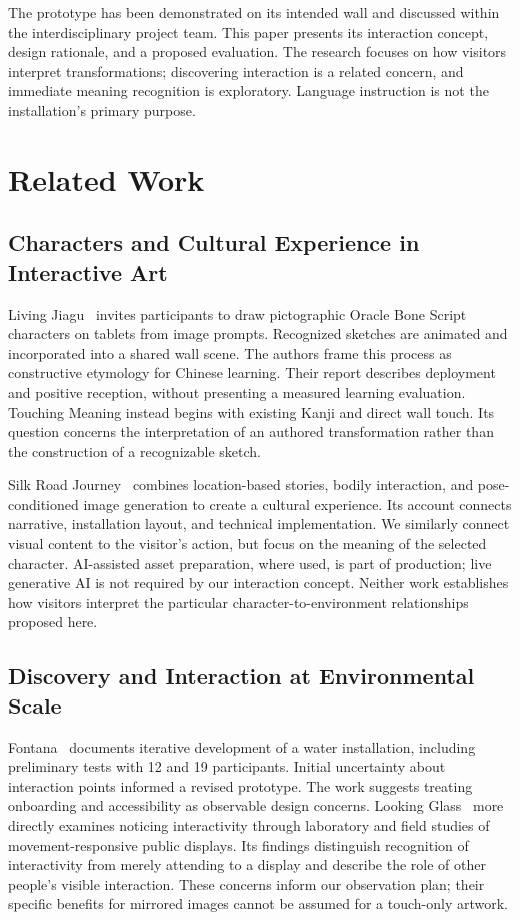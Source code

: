 \documentclass[manuscript,review,anonymous]{acmart}
\begin{document}
The prototype has been demonstrated on its intended wall and discussed within the interdisciplinary project team. This paper presents its interaction concept, design rationale, and a proposed evaluation. The research focuses on how visitors interpret transformations; discovering interaction is a related concern, and immediate meaning recognition is exploratory. Language instruction is not the installation's primary purpose.

\section{Related Work}
\subsection{Characters and Cultural Experience in Interactive Art}
Living Jiagu~\cite{cheng2020} invites participants to draw pictographic Oracle Bone Script characters on tablets from image prompts. Recognized sketches are animated and incorporated into a shared wall scene. The authors frame this process as constructive etymology for Chinese learning. Their report describes deployment and positive reception, without presenting a measured learning evaluation. Touching Meaning instead begins with existing Kanji and direct wall touch. Its question concerns the interpretation of an authored transformation rather than the construction of a recognizable sketch.

Silk Road Journey~\cite{li2024} combines location-based stories, bodily interaction, and pose-conditioned image generation to create a cultural experience. Its account connects narrative, installation layout, and technical implementation. We similarly connect visual content to the visitor's action, but focus on the meaning of the selected character. AI-assisted asset preparation, where used, is part of production; live generative AI is not required by our interaction concept. Neither work establishes how visitors interpret the particular character-to-environment relationships proposed here.

\subsection{Discovery and Interaction at Environmental Scale}
Fontana~\cite{vanrenswouw2022} documents iterative development of a water installation, including preliminary tests with 12 and 19 participants. Initial uncertainty about interaction points informed a revised prototype. The work suggests treating onboarding and accessibility as observable design concerns. Looking Glass~\cite{mueller2012} more directly examines noticing interactivity through laboratory and field studies of movement-responsive public displays. Its findings distinguish recognition of interactivity from merely attending to a display and describe the role of other people's visible interaction. These concerns inform our observation plan; their specific benefits for mirrored images cannot be assumed for a touch-only artwork.
\end{document}
